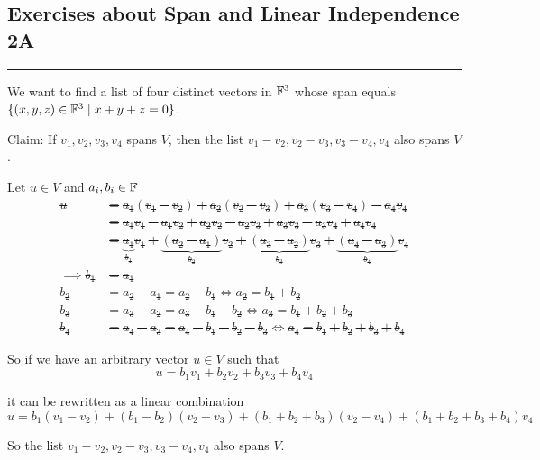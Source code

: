 \subsection*{Exercises about Span and Linear Independence 2A}
\hrule
\phantom{.}

\begin{xrcs}
  We want to find a list of four distinct vectors in $\mathbb{F}^3$ whose span equals $\{(x,y,z) \in \mathbb{F}^3 \mid x + y + z = 0 \}$.
\end{xrcs}

\begin{xrcs}
  Claim: If $v_1, v_2, v_3, v_4$ spans $V$, then the list $v_1 - v_2, v_2 -v_3, v_3 -v_4, v_4$ also spans $V$.
\end{xrcs}
\begin{prf}
  Let $u \in V$ and $a_i, b_i \in \mathbb{F}$ \st
  \[
    \begin{aligned}
      u
      &= a_1 (v_1 -v_2) + a_2 (v_2-v_3) + a_3 (v_3-v_4)-a_4 v_4 \\
      &= a_1 v_1 - a_1 v_2 + a_2v_2 - a_2 v_3 + a_3 v_3 - a_3 v_4 + a_4 v_4 \\
      &= \underbrace{a_1}_{b_1} v_1 + \underbrace{(a_2 -a_1)}_{b_2} v_2 + \underbrace{(a_3 -a_2)}_{b_3} v_3 + \underbrace{(a_4 -a_3)}_{b_4} v_4 \\
      \implies b_1 & = a_1 \\
      b_2 &= a_2 -a_1 = a_2 - b_1 \iff a_2 = b_1 + b_2 \\
      b_3 &= a_3 - a_2 = a_3 - b_1 -b_2 \iff a_3 = b_1 + b_2 + b_3 \\
      b_4 &= a_4 - a_3 = a_4 - b_1 - b_2 - b_3 \iff a_4 = b_1 + b_2 + b_3 + b_4
    \end{aligned}
  \]

  So if we have an arbitrary vector $u \in V$ such that
  \[
    u = b_1 v_1 +  b_2 v_2 + b_3 v_3 + b_4 v_4
  \]

  it can be rewritten as a linear combination
  \[
    u = b_1 (v_1 - v_2) + (b_1-b_2)(v_2-v_3) + (b_1+b_2+b_3)(v_2-v_4)+(b_1+b_2+b_3+b_4)v_4
  \]

  So the list $v_1 - v_2, v_2 -v_3, v_3 -v_4, v_4$ also spans $V$.
\end{prf}

